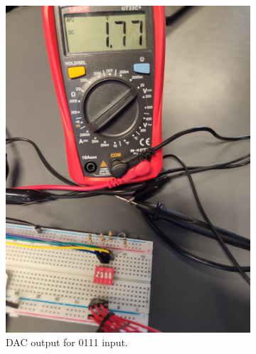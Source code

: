 \begin{figure}[H]
\begin{subfigure}[]{0.2\textwidth}
\includegraphics[width=\linewidth]{./Figures/DAC_Prac_0111.jpeg}
\caption{DAC output for 0111 input.}
\label{subfig:dac_prac_0111}	
\end{subfigure}
\hfill
\begin{subfigure}[]{0.2\textwidth}

\end{subfigure}
\end{figure}
